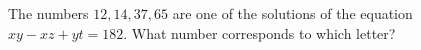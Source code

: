 The numbers $12,14,37,65$ are one of the solutions of the equation $xy-xz+yt=182$. What number corresponds to which letter?